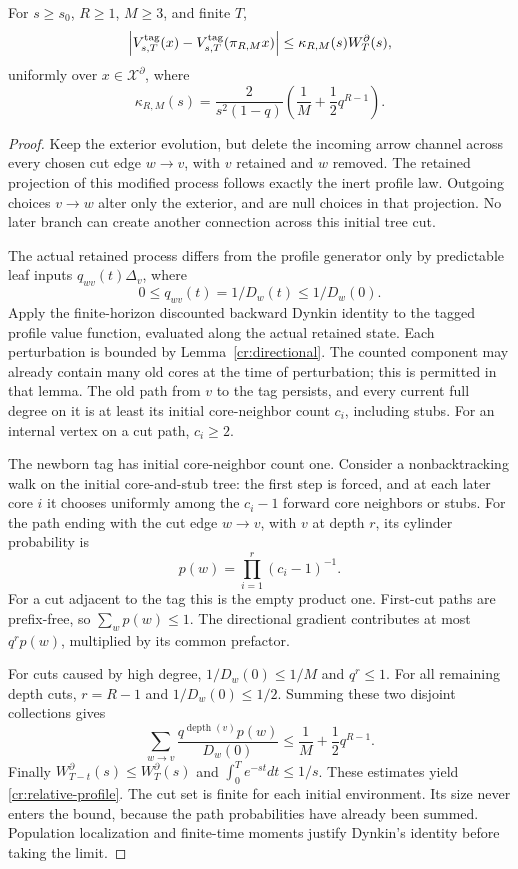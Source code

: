 \begin{lemma}
\label{cr:profiles}
For $s\ge s_0$, $R\ge1$, $M\ge3$, and finite $T$,
\begin{equation}
 \left|V_{s,T}^{\rm tag}(x)
       -V_{s,T}^{\rm tag}(\pi_{R,M}x)\right|
 \le\kappa_{R,M}(s)W_T^\partial(s),
 \label{cr:relative-profile}
\end{equation}
uniformly over $x\in\mathcal X^\partial$, where
\[
 \kappa_{R,M}(s)=\frac{2}{s^2(1-q)}
 \left(\frac1M+\frac12q^{R-1}\right).
\]
\end{lemma}
\begin{proof}
Keep the exterior evolution, but delete the incoming arrow channel
across every chosen cut edge $w\to v$, with $v$ retained and $w$
removed.  The retained projection of this modified process follows
exactly the inert profile law.  Outgoing choices $v\to w$ alter only
the exterior, and are null choices in that projection.  No later
branch can create another connection across this initial tree cut.

The actual retained process differs from the profile generator only
by predictable leaf inputs $q_{wv}(t)\Delta_v$, where
\[
 0\le q_{wv}(t)=1/D_w(t)\le1/D_w(0).
\]
Apply the finite-horizon discounted backward Dynkin identity to the
tagged profile value function, evaluated along the actual retained
state.  Each perturbation is bounded by Lemma~\ref{cr:directional}.
The counted component may already contain many old cores at the
time of perturbation; this is permitted in that lemma.  The old path
from $v$ to the tag persists, and every current full degree on it is
at least its initial core-neighbor count $c_i$, including stubs.
For an internal vertex on a cut path, $c_i\ge2$.

The newborn tag has initial core-neighbor count one.  Consider a
nonbacktracking walk on the initial core-and-stub tree: the first
step is forced, and at each later core $i$ it chooses uniformly
among the $c_i-1$ forward core neighbors or stubs.  For the path
ending with the cut edge $w\to v$, with $v$ at depth $r$, its cylinder
probability is
\[
 p(w)=\prod_{i=1}^{r}(c_i-1)^{-1}.
\]
For a cut adjacent to the tag this is the empty product one.  First-cut
paths are prefix-free, so $\sum_w p(w)\le1$.  The directional gradient
contributes at most $q^rp(w)$, multiplied by its common prefactor.

For cuts caused by high degree, $1/D_w(0)\le1/M$ and $q^r\le1$.
For all remaining depth cuts, $r=R-1$ and
$1/D_w(0)\le1/2$.  Summing these two disjoint collections gives
\[
 \sum_{w\to v}\frac{q^{\operatorname{depth}(v)}p(w)}{D_w(0)}
 \le\frac1M+\frac12q^{R-1}.
\]
Finally $W_{T-t}^\partial(s)\le W_T^\partial(s)$ and
$\int_0^T e^{-st}dt\le1/s$.  These estimates yield
\eqref{cr:relative-profile}.  The cut set is finite for each initial
environment.  Its size never enters the bound, because the path
probabilities have already been summed.  Population localization and
finite-time moments justify Dynkin's identity before taking the limit.
\end{proof}

